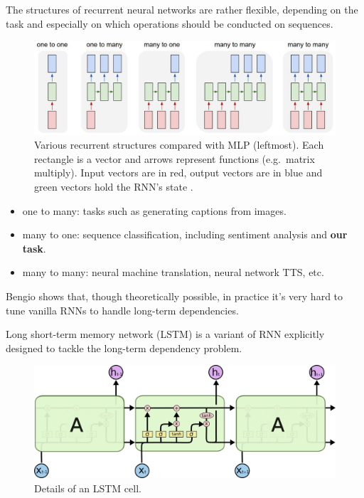 \documentclass[11pt,a4paper]{report}
\begin{document}
The structures of recurrent neural networks are rather flexible, depending on the task and especially on which operations should be conducted on sequences.

\begin{figure}[htbp]
  \centering
  \includegraphics[width=\textwidth]{rnns.jpeg}
  \caption[Various recurrent structures compared with MLP.]{Various recurrent structures compared with MLP (leftmost).
    Each rectangle is a vector and arrows represent functions (e.g.\, matrix multiply).
    Input vectors are in red, output vectors are in blue and green vectors hold the RNN's state \protect\footnotemark.}
  \label{fig:rnns}
\end{figure}


\begin{itemize}
  \item one to many: tasks such as generating captions from images.
  \item many to one: sequence classification, including sentiment analysis and \textbf{our task}.
  \item many to many: neural machine translation, neural network TTS, etc.
\end{itemize}

Bengio \parencite{bengio1994learning} shows that, though theoretically possible, in practice it's very hard to tune vanilla RNNs to handle long-term dependencies.

Long short-term memory network (LSTM) is a variant of RNN explicitly designed to tackle the long-term dependency problem.

\begin{figure}[htbp]
  \centering
  \includegraphics[width=\textwidth]{LSTM3-chain.png}
  \caption[Details of an LSTM cell.]{Details of an LSTM cell\protect\footnotemark.} \label{fig:lstm-intro}
\end{figure}
\end{document}
